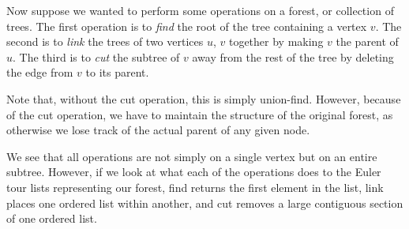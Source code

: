 \documentclass[11pt]{book}
\begin{document}
\begin{center}
{
}
\end{center}

Now suppose we wanted to perform some operations on a forest, or collection of trees. The first operation is to \textit{find} the root of the tree containing a vertex $v$. The second is to \textit{link} the trees of two vertices $u$, $v$ together by making $v$ the parent of $u$. The third is to \textit{cut} the subtree of $v$ away from the rest of the tree by deleting the edge from $v$ to its parent.

Note that, without the cut operation, this is simply union-find. However, because of the cut operation, we have to maintain the structure of the original forest, as otherwise we lose track of the actual parent of any given node.

We see that all operations are not simply on a single vertex but on an entire subtree. However, if we look at what each of the operations does to the Euler tour lists representing our forest, find returns the first element in the list, link places one ordered list within another, and cut removes a large contiguous section of one ordered list.
\end{document}
